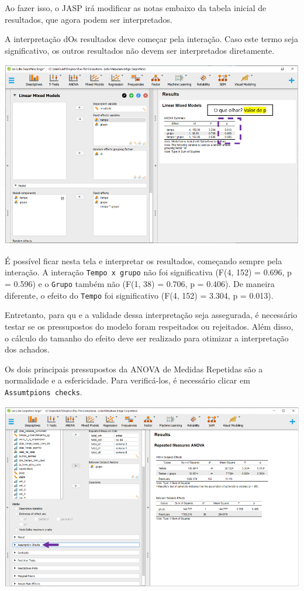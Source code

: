 \documentclass[
]{book}
\begin{document}
Ao fazer isso, o JASP irá modificar as notas embaixo da tabela inicial
de resultados, que agora podem ser interpretados.

A interpretação dOs resultados deve começar pela interação. Caso este
termo seja significativo, os outros resultados não devem ser
interpretados diretamente.

\includegraphics{./img/cap_lmm_resultados.png}

É possível ficar nesta tela e interpretar os resultados, começando
sempre pela interação. A interação \texttt{Tempo\ x\ grupo} não foi
significativa (F(4, 152) = 0.696, p = 0.596) e o \texttt{Grupo} também
não (F(1, 38) = 0.706, p = 0.406). De maneira diferente, o efeito do
\texttt{Tempo} foi significativo (F(4, 152) = 3.304, p = 0.013).

Entretanto, para qu e a validade dessa interpretação seja assegurada, é
necessário testar se os pressupostos do modelo foram respeitados ou
rejeitados. Além disso, o cálculo do tamanho do efeito deve ser
realizado para otimizar a interpretação dos achados.

Os dois principais pressupostos da ANOVA de Medidas Repetidas são a
normalidade e a esfericidade. Para verificá-los, é necessário clicar em
\texttt{Assumtpions\ checks}.

\includegraphics{./img/cap_anovarm_pressupostos.png}
\end{document}
